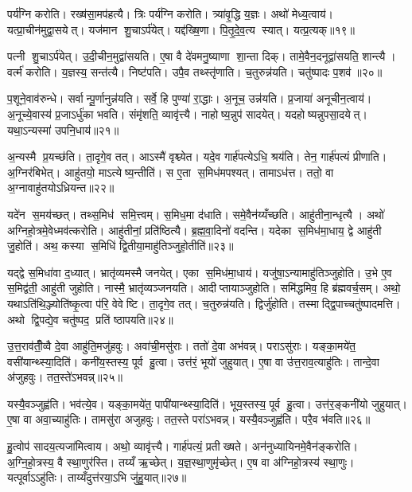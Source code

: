 पर्य॑ग्नि करोति। रख्ष॑सा॒मप॑हत्यै। त्रिः पर्य॑ग्नि करोति। त्र्या॑वृ॒द्धि य॒ज्ञः। अथो॑ मेध्य॒त्वाय॑। यत्प्रा॒चीन॑मुद्वा॒सयेत्। यज॑मान शु॒चाऽर्प॑येत्। यद्द॑ख्षि॒णा। पि॒तृ॒दे॒व॒त्य स्यात्। यत्प्र॒त्यक्॥१९॥

पत्नी शु॒चाऽर्प॑येत्। उ॒दी॒चीन॒मुद्वा॑सयति। ए॒षा वै दे॑वमनु॒ष्याणा शा॒न्ता दिक्। तामे॒वैन॒दनूद्वा॑सयति॒ शान्त्यै। वर्त्म॑ करोति। य॒ज्ञस्य॒ सन्त॑त्यै। निष्ट॑पति। उपै॒व तथ्स्तृ॑णाति। च॒तुरुन्न॑यति। चतु॑ष्पादः प॒शव॑॥२०॥

प॒शूने॒वाव॑रुन्धे। सर्वान्पू॒र्णानुन्न॑यति। सर्वे॒ हि पुण्या॑ रा॒द्धाः। अ॒नूच॒ उन्न॑यति। प्र॒जाया॑ अनूचीन॒त्वाय॑। अ॒नूच्ये॒वास्य॑ प्र॒जाऽर्धु॑का भवति। संमृ॑शति॒ व्यावृ॑त्त्यै। नाहोष्य॒न्नुप॑ सादयेत्। यदहोष्यन्नुपसा॒दयेत्। यथा॒ऽन्यस्मा॑ उपनि॒धाय॑॥२१॥

अ॒न्यस्मै प्र॒यच्छ॑ति। ता॒दृगे॒व तत्। आऽस्मै॑ वृश्च्येत। यदे॒व गार्\mbox{}ह॑पत्येऽधि॒ श्रय॑ति। तेन॒ गार्\mbox{}ह॑पत्यं प्रीणाति। अ॒ग्निर॑बिभेत्। आहु॑तयो॒ माऽत्येष्य॒न्तीति॑। स ए॒ता स॒मिध॑मपश्यत्। तामाऽध॑त्त। ततो॒ वा अ॒ग्नावाहु॑तयोऽध्रियन्त॥२२॥

यदे॑न स॒मय॑च्छत्। तथ्स॒मिध॑ समि॒त्त्वम्। स॒मिध॒मा द॑धाति। समे॒वैन॑य्यँच्छति। आहु॑तीना॒न्धृत्यै। अथो॑ अग्निहो॒त्रमे॒वेध्मव॑त्करोति। आहु॑तीनां॒ प्रति॑ष्ठित्यै। ब्र॒ह्म॒वा॒दिनो॑ वदन्ति। यदेका स॒मिध॑मा॒धाय॒ द्वे आहु॑ती जु॒होति॑। अथ॒ कस्या स॒मिधि॑ द्वि॒तीया॒माहु॑तिञ्जुहो॒तीति॑॥२३॥

यद्द्वे स॒मिधा॑वा द॒ध्यात्। भ्रातृ॑व्यमस्मै जनयेत्। एका स॒मिध॑मा॒धाय॑। यजु॑षा॒ऽन्यामाहु॑तिञ्जुहोति। उ॒भे ए॒व स॒मिद्व॑ती॒ आहु॑ती जुहोति। नास्मै॒ भ्रातृ॑व्यञ्जनयति। आदीप्तायाञ्जुहोति। समि॑द्धमिव॒ हि ब्र॑ह्मवर्च॒सम्। अथो॒ यथाऽति॑थि॒ञ्ज्योति॑ष्कृ॒त्वा प॑रि॒ वेवेष्टि। ता॒दृगे॒व तत्। च॒तुरुन्न॑यति। द्विर्जु॑होति। तस्माद्द्वि॒पाच्चतु॑ष्पादमत्ति। अथो द्वि॒पद्ये॒व चतु॑ष्पद॒ प्रति॑ ष्ठापयति॥२४॥

उ॒त्त॒राव॑तीँ॒व्वै दे॒वा आहु॑ति॒मजु॑हवुः। अवा॑ची॒मसु॑राः। ततो॑ दे॒वा अभ॑वन्न्। पराऽसु॑राः। यङ्का॒मये॑त॒ वसी॑यान्थ्स्या॒दिति॑। कनी॑य॒स्तस्य॒ पूर्व हु॒त्वा। उत्त॑रं॒ भूयो॑ जुहुयात्। ए॒षा वा उ॑त्त॒राव॒त्याहु॑तिः। तान्दे॒वा अ॑जुहवुः। तत॒स्ते॑ऽभवन्न्॥२५॥

यस्यै॒वञ्जुह्व॑ति। भव॑त्ये॒व। यङ्का॒मये॑त॒ पापी॑यान्थ्स्या॒दिति॑। भूय॒स्तस्य॒ पूर्व हु॒त्वा। उत्त॑र॒ङ्कनी॑यो जुहुयात्। ए॒षा वा अवा॒च्याहु॑तिः। तामसु॑रा अजुहवुः। तत॒स्ते परा॑ऽभवन्न्। यस्यै॒वञ्जुह्व॑ति। परै॒व भ॑वति॥२६॥

हु॒त्वोप॑ सादय॒त्यजा॑मित्वाय। अथो॒ व्यावृ॑त्त्यै। गार्\mbox{}ह॑पत्यं॒ प्रतीख्षते। अन॑नुध्यायिनमे॒वैन॑ङ्करोति। अ॒ग्नि॒हो॒त्रस्य॒ वै स्था॒णुर॑स्ति। तय्यँ ऋ॒च्छेत्। य॒ज्ञ॒स्था॒णुमृ॑च्छेत्। ए॒ष वा अ॑ग्निहो॒त्रस्य॑ स्था॒णुः। यत्पूर्वाऽऽहु॑तिः। ताय्यँदुत्त॑रया॒ऽभि जु॑हु॒यात्॥२७॥

